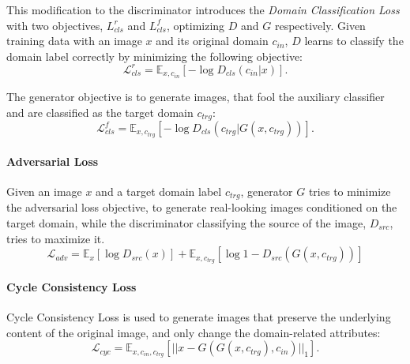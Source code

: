 \documentclass{article}
\begin{document}
This modification to the discriminator introduces the \textit{Domain Classification Loss} with two objectives, ${L}^{r}_{cls}$ and ${L}^{f}_{cls}$, optimizing $D$ and $G$ respectively. Given training data with an image $x$ and its original domain $c_{in}$, $D$ learns to classify the domain label correctly by minimizing the following objective:
\begin{equation}
\mathcal{L}^{r}_{cls} = \mathbb{E}_{x,c_{in}}[-\log D_{cls}(c_{in}|x)].
\label{eq:stargan_clsr}
\end{equation}

The generator objective is to generate images, that fool the auxiliary classifier and are classified as the target domain $c_{trg}$:
\begin{equation}
\mathcal{L}^{f}_{cls} = \mathbb{E}_{x,c_{trg}}[-\log D_{cls}(c_{trg}|G(x, c_{trg}))].
\label{eq:stargan_clsf}
\end{equation}


\paragraph{Adversarial Loss}
Given an image $x$ and a target domain label $c_{trg}$, generator $G$ tries to minimize the adversarial loss objective, to generate real-looking images conditioned on the target domain, while the discriminator classifying the source of the image, $D_{src}$, tries to maximize it.
\begin{equation}
\mathcal{L}_{adv} = \mathbb{E}_{x}[\log D_{src}(x)] + \mathbb{E}_{x, c_{trg}}[\log 1 - D_{src}(G(x, c_{trg}))]
\label{eq:stargan_adv}
\end{equation}

\paragraph{Cycle Consistency Loss}
Cycle Consistency Loss \cite{zhu_unpaired_2017} is used to generate images that preserve the underlying content of the original image, and only change the domain-related attributes:
\begin{equation}
\mathcal{L}_{cyc} = \mathbb{E}_{x,c_{in},c_{trg}}[||x - G(G(x,c_{trg}), c_{in})||_{1}].
\label{eq:stargan_cyc}
\end{equation}
\end{document}
